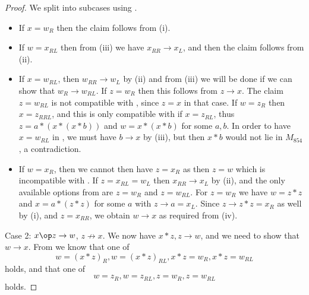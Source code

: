 \begin{proof}
We split into subcases using .
\begin{itemize}
  \item If $x = w_R$ then the claim follows from (i).
  \item If $w = x_{RL}$ then from (iii) we have $x_{RR} \to x_L$, and then the claim follows from (ii).
  \item If $x = w_{RL}$, then $w_{RR} \to w_L$ by (ii) and from (iii) we will be done if we can show that $w_R \to w_{RL}$.  If $z = w_R$ then this follows from $z \to x$.  The claim $z = w_{RL}$ is not compatible with , since $z=x$ in that case. If $w = z_R$ then $x = z_{RRL}$, and this is only compatible with  if $x = z_{RL}$, thus $z = a * (x * (x * b))$ and $w = x  * (x * b)$ for some $a,b$.  In order to have $x = w_{RL}$ in , we must have $b \to x$ by (iii), but then $x*b$ would not lie in $M_{854}$, a contradiction.
  \item If $w = x_R$, then we cannot then have $z = x_R$ as then $z=w$ which is incompatible with .  If $z = x_{RL} = w_L$ then $x_{RR} \to x_L$ by (ii), and the only available options from  are $z = w_R$ and $z = w_{RL}$.  For $z=w_R$ we have $w = z * z$ and $x = a * (z * z)$ for some $a$ with $z \to a = x_L$.  Since $z \to z*z = x_R$ as well by (i), and $z = x_{RR}$, we obtain $w \to x$ as required from (iv).
\end{itemize}

Case 2: $x \op z \to w$, $z \not \to x$.  We now have $x * z, z \to w$, and we need to show that $w \to x$.  From  we know that one of
\begin{equation}\label{wz-1}
 w = (x * z)_R, w = (x * z)_{RL}, x * z = w_R, x * z = w_{RL}
\end{equation}
holds, and that one of
\begin{equation}\label{wz}
  w =  z_R, w = z_{RL}, z = w_R, z = w_{RL}
\end{equation}
holds.


\end{proof}
